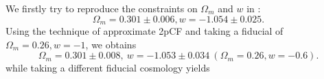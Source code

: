 \documentclass[useAMS,usenatbib]{mnras}
\begin{document}
We firstly try to reproduce the constraints on $\Omega_m$ and $w$ in \citep{Li2016}:
\begin{equation}\label{eq:wcdm_constrain_default}
 \Omega_m=0.301\pm 0.006, w=−1.054\pm 0.025.
\end{equation}
Using the technique of approximate 2pCF and taking a fiducial of $\Omega_m=0.26, w=-1$, we obtains
\begin{equation}
\Omega_m = 0.301 \pm 0.008,\ w=-1.053\pm 0.034\ (\Omega_m=0.26, w=-0.6).
\end{equation}
while taking a different fiducial cosmology yields
\end{document}
